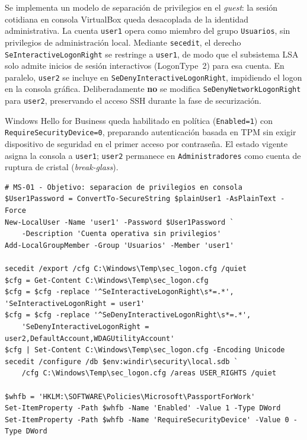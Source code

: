 Se implementa un modelo de separación de privilegios en el \textit{guest}: la sesión cotidiana en consola VirtualBox queda desacoplada de la identidad administrativa. La cuenta \texttt{user1} opera como miembro del grupo \texttt{Usuarios}, sin privilegios de administración local. Mediante \texttt{secedit}, el derecho \texttt{SeInteractive}\allowbreak\texttt{LogonRight} se restringe a \texttt{user1}, de modo que el subsistema LSA solo admite inicios de sesión interactivos (LogonType~2) para esa cuenta. En paralelo, \texttt{user2} se incluye en \texttt{SeDeny}\allowbreak\texttt{Interactive}\allowbreak\texttt{LogonRight}, impidiendo el logon en la consola gráfica. Deliberadamente \textbf{no} se modifica \texttt{SeDeny}\allowbreak\texttt{Network}\allowbreak\texttt{LogonRight} para \texttt{user2}, preservando el acceso SSH durante la fase de securización.

Windows Hello for Business queda habilitado en política (\texttt{Enabled=1}) con \texttt{Require}\allowbreak\texttt{Security}\allowbreak\texttt{Device=0}, preparando autenticación basada en TPM sin exigir dispositivo de seguridad en el primer acceso por contraseña. El estado vigente asigna la consola a \texttt{user1}; \texttt{user2} permanece en \texttt{Administradores} como cuenta de ruptura de cristal (\textit{break-glass}).

\begin{lstlisting}[caption={MS-01 --- Objetivo: alta de \texttt{user1} y restricción de logon interactivo.}]
# MS-01 - Objetivo: separacion de privilegios en consola
$User1Password = ConvertTo-SecureString $plainUser1 -AsPlainText -Force
New-LocalUser -Name 'user1' -Password $User1Password `
    -Description 'Cuenta operativa sin privilegios'
Add-LocalGroupMember -Group 'Usuarios' -Member 'user1'

secedit /export /cfg C:\Windows\Temp\sec_logon.cfg /quiet
$cfg = Get-Content C:\Windows\Temp\sec_logon.cfg
$cfg = $cfg -replace '^SeInteractiveLogonRight\s*=.*', 'SeInteractiveLogonRight = user1'
$cfg = $cfg -replace '^SeDenyInteractiveLogonRight\s*=.*',
    'SeDenyInteractiveLogonRight = user2,DefaultAccount,WDAGUtilityAccount'
$cfg | Set-Content C:\Windows\Temp\sec_logon.cfg -Encoding Unicode
secedit /configure /db $env:windir\security\local.sdb `
    /cfg C:\Windows\Temp\sec_logon.cfg /areas USER_RIGHTS /quiet

$whfb = 'HKLM:\SOFTWARE\Policies\Microsoft\PassportForWork'
Set-ItemProperty -Path $whfb -Name 'Enabled' -Value 1 -Type DWord
Set-ItemProperty -Path $whfb -Name 'RequireSecurityDevice' -Value 0 -Type DWord
\end{lstlisting}

